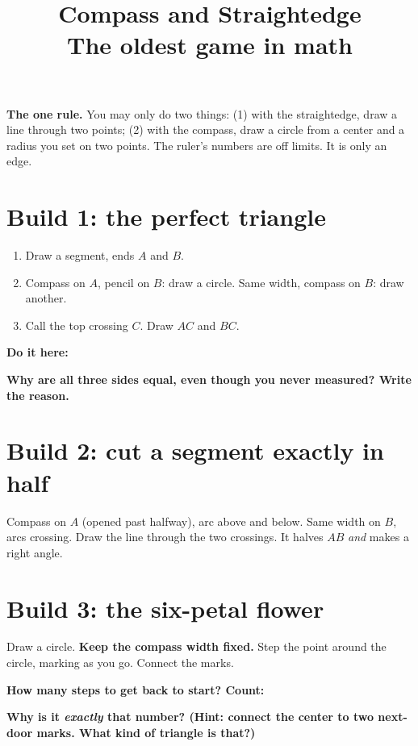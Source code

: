 \documentclass[11pt]{article}
\title{\vspace{-1.5cm}\textbf{Compass and Straightedge}\\[-2pt]
  \large The oldest game in math}
\author{}
\date{}
\newcommand{\drawbox}[1]{%
  \par\vspace{4pt}\noindent
  \fbox{\rule{0pt}{#1}\rule{\dimexpr\linewidth-2\fboxsep-2\fboxrule}{0pt}}%
  \par\vspace{6pt}}
\newcommand{\task}[1]{\par\medskip\noindent\textbf{\color{benblue}#1}\par\nopagebreak}
\begin{document}
\maketitle
\vspace{-1.2cm}

\noindent\textbf{The one rule.} You may only do two things:
(1) with the straightedge, draw a line through two points;
(2) with the compass, draw a circle from a center and a radius you set on two
points. The ruler's numbers are off limits. It is only an edge.

\section*{Build 1: the perfect triangle}
\begin{enumerate}[leftmargin=*]
  \item Draw a segment, ends $A$ and $B$.
  \item Compass on $A$, pencil on $B$: draw a circle. Same width, compass on $B$:
        draw another.
  \item Call the top crossing $C$. Draw $AC$ and $BC$.
\end{enumerate}
\task{Do it here:}
\drawbox{4.5cm}
\task{Why are all three sides equal, even though you never measured? Write the reason.}
\drawbox{2.2cm}

\section*{Build 2: cut a segment exactly in half}
Compass on $A$ (opened past halfway), arc above and below. Same width on $B$,
arcs crossing. Draw the line through the two crossings. It halves $AB$ \emph{and}
makes a right angle.
\drawbox{4cm}

\section*{Build 3: the six-petal flower}
Draw a circle. \textbf{Keep the compass width fixed.} Step the point around the
circle, marking as you go. Connect the marks.
\task{How many steps to get back to start? Count: \underline{\hspace{2cm}}}
\drawbox{4.5cm}
\task{Why is it \emph{exactly} that number? (Hint: connect the center to two
next-door marks. What kind of triangle is that?)}
\drawbox{2.2cm}
\end{document}
